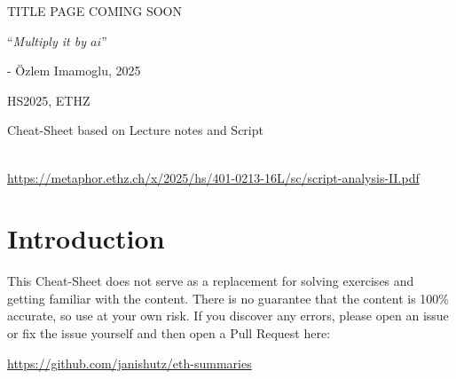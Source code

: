 \documentclass{article}
\begin{document}
\maketitle
\usetcolorboxes
\setcounter{numberingConfig}{3}
\setcounter{numberSubsections}{1}


\vspace{2cm}
\begin{Huge}
    \begin{center}
        TITLE PAGE COMING SOON
    \end{center}
\end{Huge}


\vspace{4cm}
\begin{center}
    \begin{Large}
        ``\textit{Multiply it by $ai$}''
    \end{Large}

    \hspace{3cm} - Özlem Imamoglu, 2025
\end{center}

\vspace{3cm}
\begin{center}
    HS2025, ETHZ\\[0.2cm]
    \begin{Large}
        Cheat-Sheet based on Lecture notes and Script
    \end{Large}\\[0.2cm]

    \url{https://metaphor.ethz.ch/x/2025/hs/401-0213-16L/sc/script-analysis-II.pdf} 
\end{center}


\newpage
{}


\newpage
\section{Introduction}
This Cheat-Sheet does not serve as a replacement for solving exercises and getting familiar with the content.
There is no guarantee that the content is 100\% accurate, so use at your own risk. 
If you discover any errors, please open an issue or fix the issue yourself and then open a Pull Request here:

\url{https://github.com/janishutz/eth-summaries}
\end{document}
